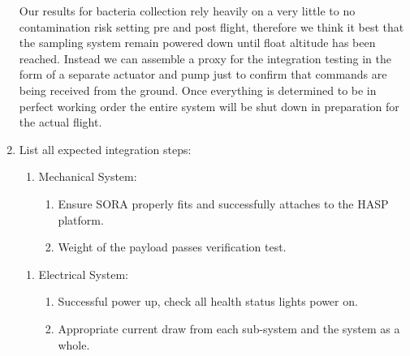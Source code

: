 \begin{minipage}{\linewidth-0.5cm}
\begin{enumerate}[label = \Alph*.]
        Our results for bacteria collection rely heavily on a very little to no contamination risk setting pre and post flight, therefore we think it best that the sampling system remain powered down until float altitude has been reached. Instead we can assemble a proxy for the integration testing in the form of a separate actuator and pump just to confirm that commands are being received from the ground. Once everything is determined to be in perfect working order the entire system will be shut down in preparation for the actual flight.

  \item List all expected integration steps:
        \begin{enumerate}[label = -]
          \item Mechanical System:
          \begin{enumerate}
            \item Ensure SORA properly fits and successfully attaches to the HASP platform.
            \item Weight of the payload passes verification test.
          \end{enumerate}
        \end{enumerate}

        \begin{enumerate}[label = -]
          \item Electrical System:
          \begin{enumerate}
            \item Successful power up, check all health status lights power on.
            \item Appropriate current draw from each sub-system and the system as a whole.
          \end{enumerate}
        \end{enumerate}

  \end{enumerate}
\end{minipage}




